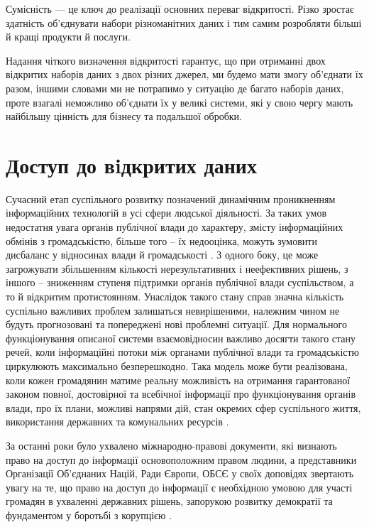 Сумісність — це ключ до реалізації основних переваг
відкритості. Різко зростає здатність об'єднувати набори
різноманітних даних і тим самим розробляти більші й кращі
продукти й послуги.

Надання чіткого визначення відкритості гарантує, що при отриманні
двох відкритих наборів даних з двох різних джерел, ми будемо мати
змогу об'єднати їх разом, іншими словами ми не потрапимо у ситуацію
де багато наборів даних, проте взагалі неможливо об'єднати їх у великі
системи, які у свою чергу мають найбільшу цінність для бізнесу та подальшої обробки.

\section{Доступ до вiдкритих даних}

Сучасний етап суспільного розвитку позначений динамічним
проникненням інформаційних технологій в усі сфери людської
діяльності. За таких умов недостатня увага органів публічної влади
до характеру, змісту інформаційних обмінів з громадськістю, більше
того – їх недооцінка, можуть зумовити дисбаланс у відносинах влади
й громадськості \cite{TheGlobalImpact}.
З одного боку, це може загрожувати збільшенням
кількості нерезультативних і неефективних рішень, з іншого –
зниженням ступеня підтримки органів публічної влади суспільством, а
то й відкритим протистоянням. Унаслідок такого стану справ значна
кількість суспільно важливих проблем залишаться невирішеними,
належним чином не будуть прогнозовані та попереджені нові проблемні ситуації.
Для нормального функціонування описаної системи взаємовідносин важливо
досягти такого стану речей, коли інформаційні
потоки між органами публічної влади та громадськістю циркулюють
максимально безперешкодно. Така модель може бути реалізована,
коли кожен громадянин матиме реальну можливість на отримання
гарантованої законом повної, достовірної та всебічної інформації про
функціонування органів влади, про їх плани, можливі напрями дій,
стан окремих сфер суспільного життя, використання державних та
комунальних ресурсів \cite{FakeOpenDataEcosystem}.

За останні роки було ухвалено міжнародно-правові документи,
які визнають право на доступ до інформації основоположним правом
людини, а представники Організації Об’єднаних Націй, Ради Європи,
ОБСЄ у своїх доповідях звертають увагу на те, що право на доступ
до інформації є необхідною умовою для участі громадян в ухваленні
державних рішень, запорукою розвитку демократії та фундаментом у
боротьбі з корупцією \cite{EGAPOpenDataBook}.

